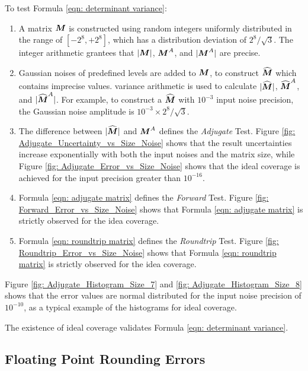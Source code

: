 \documentclass[twoside]{article}
\numberwithin{equation}{section}
\begin{document}
To test Formula \eqref{eqn: determinant variance}:
\begin{enumerate}
\item A matrix $\protect{\textrm{\boldmath $M$}}$ is constructed using random integers uniformly distributed in the range of $[-2^8, +2^8]$, which has a distribution deviation of $2^8/\sqrt{3}$.
The integer arithmetic grantees that $|\protect{\textrm{\boldmath $M$}}|$, $\protect{\textrm{\boldmath $M$}}^A$, and $|\protect{\textrm{\boldmath $M$}}^A|$ are precise.

\item Gaussian noises of predefined levels are added to $\protect{\textrm{\boldmath $M$}}$, to construct $\widehat{\protect{\textrm{\boldmath $M$}}}$ which contains imprecise values.
variance arithmetic is used to calculate $|\widehat{\protect{\textrm{\boldmath $M$}}}|$, $\widehat{\protect{\textrm{\boldmath $M$}}}^A$, and $|\widehat{\protect{\textrm{\boldmath $M$}}}^A|$.
For example, to construct a $\widehat{\protect{\textrm{\boldmath $M$}}}$ with $10^{-3}$ input noise precision, the Gaussian noise amplitude is $10^{-3} \times 2^8/\sqrt{3}$.

\item The difference between $|\widehat{\protect{\textrm{\boldmath $M$}}}|$ and $\protect{\textrm{\boldmath $M$}}^A$ defines the \emph{Adjugate} Test.
Figure \ref{fig: Adjugate_Uncertainty_vs_Size_Noise} shows that the result uncertainties increase exponentially with both the input noises and the matrix size, while Figure \ref{fig: Adjugate_Error_vs_Size_Noise} shows that the ideal coverage is achieved for the input precision greater than $10^{-16}$.

\item Formula \eqref{eqn: adjugate matrix} defines the \emph{Forward} Test.
Figure \ref{fig: Forward_Error_vs_Size_Noise} shows that Formula \eqref{eqn: adjugate matrix} is strictly observed for the idea coverage.

\item Formula \eqref{eqn: roundtrip  matrix} defines the \emph{Roundtrip} Test.
Figure \ref{fig: Roundtrip_Error_vs_Size_Noise} shows that Formula \eqref{eqn: roundtrip matrix} is strictly observed for the idea coverage.

\end{enumerate}

Figure \ref{fig: Adjugate_Histogram_Size_7} and \ref{fig: Adjugate_Histogram_Size_8} shows that the error values are normal distributed for the input noise precision of  $10^{-10}$, as a typical example of the histograms for ideal coverage.

The existence of ideal coverage validates Formula \eqref{eqn: determinant variance}.


\subsection{Floating Point Rounding Errors}
\end{document}
